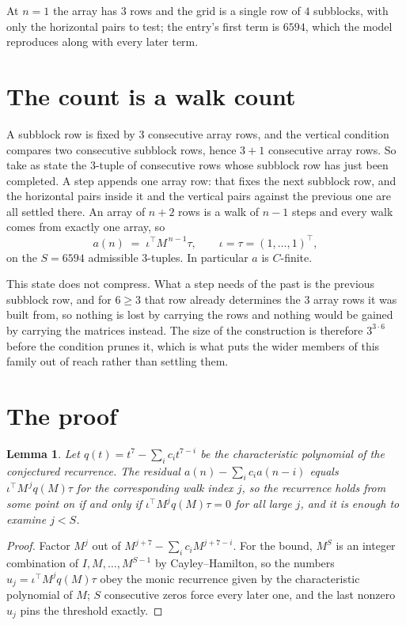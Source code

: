 \documentclass[11pt,a4paper]{article}
\theoremstyle{plain}
\newtheorem{lemma}[theorem]{Lemma}
\theoremstyle{definition}
\begin{document}
At $n=1$ the array has $3$ rows and the grid is a single row of $4$
subblocks, with only the horizontal pairs to test; the entry's first term is
$6594$, which the model reproduces along with every later term.

\section{The count is a walk count}

A subblock row is fixed by $3$ consecutive array rows, and the vertical condition compares
two consecutive subblock rows, hence $3+1$ consecutive array rows. So take as state the
$3$-tuple of consecutive rows whose subblock row has just been completed. A step appends one
array row: that fixes the next subblock row, and the horizontal pairs inside it and the
vertical pairs against the previous one are all settled there. An array of $n+2$ rows is
a walk of $n-1$ steps and every walk comes from exactly one array, so
\[
a(n)\;=\;\iota^{\!\top}M^{\,n-1}\tau,\qquad\iota=\tau=(1,\dots,1)^{\!\top},
\]
on the $S=6594$ admissible $3$-tuples. In particular $a$ is $C$-finite.

This state does not compress. What a step needs of the past is the previous subblock row, and
for $6\ge3$ that row already determines the $3$ array rows it was built from, so nothing
is lost by carrying the rows and nothing would be gained by carrying the matrices instead. The
size of the construction is therefore $3^{3\cdot6}$ before the condition prunes
it, which is what puts the wider members of this family out of reach rather than settling them.

\section{The proof}

\begin{lemma}\label{lem:crit}
Let $q(t)=t^{7}-\sum_i c_it^{7-i}$ be the characteristic polynomial of the
conjectured recurrence. The residual $a(n)-\sum_ic_ia(n-i)$ equals
$\iota^{\!\top}M^{\,j}q(M)\tau$ for the corresponding walk index $j$, so the recurrence
holds from some point on if and only if $\iota^{\!\top}M^{j}q(M)\tau=0$ for all large $j$,
and it is enough to examine $j<S$.
\end{lemma}

\begin{proof}
Factor $M^{j}$ out of $M^{j+7}-\sum_ic_iM^{j+7-i}$. For the bound, $M^{S}$
is an integer combination of $I,M,\dots,M^{S-1}$ by Cayley--Hamilton, so the numbers
$u_j=\iota^{\!\top}M^{j}q(M)\tau$ obey the monic recurrence given by the characteristic
polynomial of $M$; $S$ consecutive zeros force every later one, and the last nonzero $u_j$
pins the threshold exactly.
\end{proof}
\end{document}
